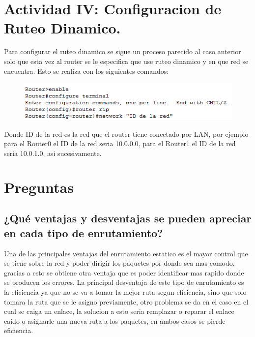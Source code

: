 \documentclass[spanish]{udpreport}
\begin{document}
\vspace{16cm}

\section{Actividad IV: Configuracion de Ruteo Dinamico.}

Para configurar el ruteo dinamico se sigue un proceso parecido al caso anterior solo que esta vez al router se le especifica que use ruteo dinamico y en que red se encuentra. Esto se realiza con los siguientes comandos:

\begin{figure}[H]
\begin{center}
\includegraphics[scale=1]{images/comandos2.PNG}
\end{center}
\end{figure}

Donde ID de la red es la red que el router tiene conectado por LAN, por ejemplo para el Router0 el ID de la red seria 10.0.0.0, para el Router1 el ID de la red seria 10.0.1.0, asi sucesivamente.

\section{Preguntas}
\subsection{¿Qué ventajas y desventajas se pueden apreciar en cada tipo de enrutamiento?}

Una de las principales ventajas del enrutamiento estatico es el mayor control que se tiene sobre la red y poder dirigir los paquetes por donde sea mas comodo, gracias a esto se obtiene otra ventaja que es poder identificar mas rapido donde se producen los errores. La principal desventaja de este tipo de enrutamiento es la eficiencia ya que no se va a tomar la mejor ruta segun eficiencia, sino que solo tomara la ruta que se le asigno previamente, otro problema se da en el caso en el cual se caiga un enlace, la solucion a esto seria remplazar o reparar el enlace caido o asignarle una nueva ruta a los paquetes, en ambos casos se pierde eficiencia.\\
\end{document}
